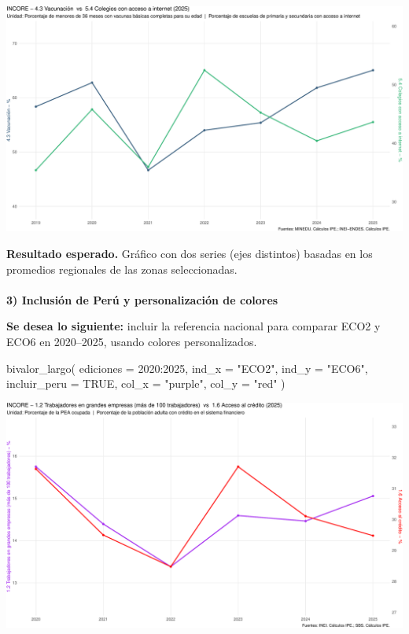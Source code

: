 \documentclass[
  11pt,
  letterpaper,
  DIV=11,
  numbers=noendperiod]{scrartcl}
\makeatletter
\let\oldparagraph\paragraph
\renewcommand{\paragraph}{
    \@ifstar
      \xxxParagraphStar
      \xxxParagraphNoStar
  }
\newcommand{\xxxParagraphStar}[1]{\oldparagraph*{#1}\mbox{}}
\newcommand{\xxxParagraphNoStar}[1]{\oldparagraph{#1}\mbox{}}
\newenvironment{Shaded}{\begin{snugshade}}{\end{snugshade}}
\newcommand{\AttributeTok}[1]{\textcolor[rgb]{0.40,0.45,0.13}{#1}}
\newcommand{\ConstantTok}[1]{\textcolor[rgb]{0.56,0.35,0.01}{#1}}
\newcommand{\DecValTok}[1]{\textcolor[rgb]{0.68,0.00,0.00}{#1}}
\newcommand{\FunctionTok}[1]{\textcolor[rgb]{0.28,0.35,0.67}{#1}}
\newcommand{\NormalTok}[1]{\textcolor[rgb]{0.00,0.23,0.31}{#1}}
\newcommand{\SpecialCharTok}[1]{\textcolor[rgb]{0.37,0.37,0.37}{#1}}
\newcommand{\StringTok}[1]{\textcolor[rgb]{0.13,0.47,0.30}{#1}}
\makeatother
\begin{document}
\includegraphics{Manual_files/figure-pdf/unnamed-chunk-107-1.pdf}

\textbf{Resultado esperado.} Gráfico con dos series (ejes distintos)
basadas en los promedios regionales de las zonas seleccionadas.

\paragraph{\texorpdfstring{\textbf{3) Inclusión de Perú y
personalización de
colores}}{3) Inclusión de Perú y personalización de colores}}\label{inclusiuxf3n-de-peruxfa-y-personalizaciuxf3n-de-colores}

\textbf{Se desea lo siguiente:} incluir la referencia nacional para
comparar ECO2 y ECO6 en 2020--2025, usando colores personalizados.

\begin{Shaded}
\begin{Highlighting}[]
\FunctionTok{bivalor\_largo}\NormalTok{(}
  \AttributeTok{ediciones    =} \DecValTok{2020}\SpecialCharTok{:}\DecValTok{2025}\NormalTok{,}
  \AttributeTok{ind\_x        =} \StringTok{"ECO2"}\NormalTok{,}
  \AttributeTok{ind\_y        =} \StringTok{"ECO6"}\NormalTok{,}
  \AttributeTok{incluir\_peru =} \ConstantTok{TRUE}\NormalTok{,}
  \AttributeTok{col\_x        =} \StringTok{"purple"}\NormalTok{,}
  \AttributeTok{col\_y        =} \StringTok{"red"}
\NormalTok{)}
\end{Highlighting}
\end{Shaded}

\includegraphics{Manual_files/figure-pdf/unnamed-chunk-108-1.pdf}
\end{document}
